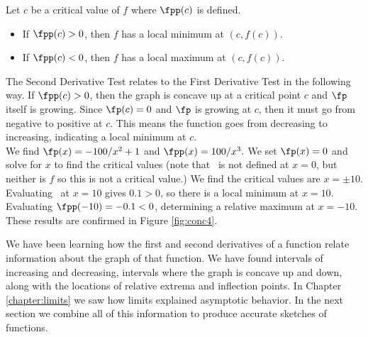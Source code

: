 
%
{ Let $c$ be a critical value of $f$ where  $\fpp(c)$ is defined. 
\begin{itemize}
\item If $\fpp(c)>0$, then $f$ has a local minimum at $(c,f(c))$.
\item If $\fpp(c)<0$, then $f$ has a local maximum at $(c,f(c))$.
\end{itemize}
}




The Second Derivative Test relates to the First Derivative Test in the following way. If $\fpp(c)>0$, then the graph is concave up at a critical point $c$ and $\fp$ itself is growing.  Since $\fp(c)=0$ and $\fp$ is growing at $c$, then it must go from negative to positive at $c$.  This means the function goes from decreasing to increasing, indicating a local minimum at $c$.\\

{We find $\fp(x)=-100/x^2+1$ and $\fpp(x) = 100/x^3.$  We set $\fp(x)=0$ and solve for $x$ to find the critical values (note that \fp\ is not defined at $x=0$, but neither is $f$ so this is not a critical value.) We find  the critical values are $x=\pm 10$.  Evaluating \fpp\ at $x=10$ gives $0.1>0$, so there is a local minimum at $x=10$.  Evaluating $\fpp(-10)=-0.1<0$, determining a relative maximum at  $x=-10$. These results are confirmed in Figure \ref{fig:conc4}.
}\\


We have been learning how the first and second derivatives of a function relate information about the graph of that function. We have found intervals of increasing and decreasing, intervals where the graph is concave up and down, along with the locations of relative extrema and inflection points. In Chapter \ref{chapter:limits} we saw how limits explained asymptotic behavior. In the next section we combine all of this information to produce accurate sketches of functions.


